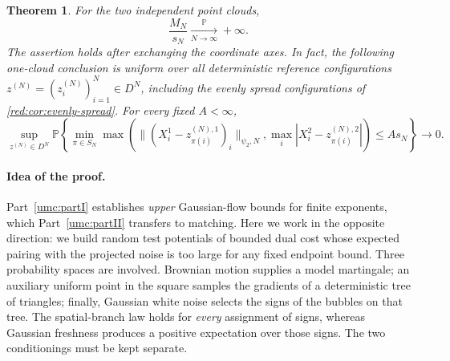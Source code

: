 \documentclass[11pt]{article}
\newtheorem{theorem}{Theorem}[section]
\theoremstyle{definition}
\theoremstyle{remark}
\numberwithin{equation}{section}
\begin{document}
\begin{theorem}
\label{neg:thm:main}
For the two independent point clouds,
\begin{equation}\label{neg:eq:negative-result}
  \frac{M_N}{s_N}\xrightarrow[N\to\infty]{\mathbb P}+\infty.
\end{equation}
The assertion holds after exchanging the coordinate axes. In fact,
the following one-cloud conclusion is uniform over \emph{all}
deterministic reference configurations $z^{(N)}=(z_i^{(N)})_{i=1}^N\in D^N$,
including the evenly spread configurations of
\cref{red:cor:evenly-spread}. For every fixed
$A<\infty$,
\begin{equation}\label{neg:eq:reference-negative}
 \sup_{z^{(N)}\in D^N}\mathbb P\!\left\{
   \min_{\pi\in S_N}\max\left(
     \|(X_i^1-z_{\pi(i)}^{(N),1})_i\|_{\psi_2,N},
     \max_i|X_i^2-z_{\pi(i)}^{(N),2}|
   \right)\le A s_N\right\}\longrightarrow0.
\end{equation}
\end{theorem}

\paragraph{Idea of the proof.}
Part~\ref{umc:partI} establishes \emph{upper} Gaussian-flow bounds for
finite exponents, which Part~\ref{umc:partII} transfers to matching. Here
we work in the opposite direction: we build random test potentials of
bounded dual cost whose expected pairing with the projected noise is
too large for any fixed endpoint bound.
Three probability spaces are involved. Brownian motion supplies
a model martingale; an auxiliary uniform point in the square samples
the gradients of a deterministic tree of triangles; finally, Gaussian
white noise selects the signs of the bubbles on that tree. The
spatial-branch law holds for \emph{every} assignment of signs,
whereas Gaussian freshness produces a positive expectation over those
signs. The two conditionings must be kept separate.
\end{document}
